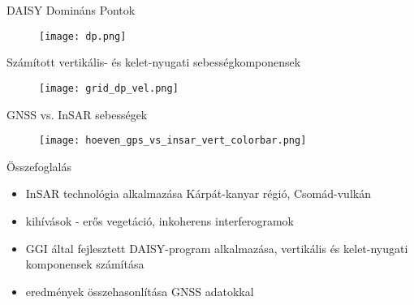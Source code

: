\documentclass[14pt, aspectratio=169]{beamer}
\begin{document}

\begin{frame}{DAISY Domináns Pontok}
    \begin{figure}
        \centering
        \texttt{[image: dp.png]}
    \end{figure}
\end{frame}


\begin{frame}{Számított vertikális- és kelet-nyugati sebességkomponensek}
    \begin{figure}
        \centering
        \texttt{[image: grid\_dp\_vel.png]}
    \end{figure}
\end{frame}


\begin{frame}{GNSS vs. InSAR sebességek}
    \begin{figure}
        \centering
        \texttt{[image: hoeven\_gps\_vs\_insar\_vert\_colorbar.png]}
    \end{figure}
\end{frame}


\begin{frame}{Összefoglalás}
    \begin{itemize}
        \item InSAR technológia alkalmazása Kárpát-kanyar régió, Csomád-vulkán
        \item kihívások - erős vegetáció, inkoherens interferogramok
        \item GGI által fejlesztett DAISY-program alkalmazása, vertikális és kelet-nyugati komponensek
        számítása
        \item eredmények összehasonlítása GNSS adatokkal
    \end{itemize}
\end{frame}


\begin{frame}

\end{frame}
\end{document}

